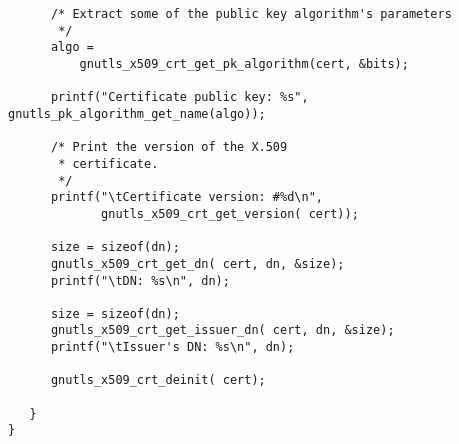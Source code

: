 \begin{verbatim}
      /* Extract some of the public key algorithm's parameters
       */
      algo =
          gnutls_x509_crt_get_pk_algorithm(cert, &bits);

      printf("Certificate public key: %s", gnutls_pk_algorithm_get_name(algo));

      /* Print the version of the X.509 
       * certificate.
       */
      printf("\tCertificate version: #%d\n",
             gnutls_x509_crt_get_version( cert));

      size = sizeof(dn);
      gnutls_x509_crt_get_dn( cert, dn, &size);
      printf("\tDN: %s\n", dn);

      size = sizeof(dn);
      gnutls_x509_crt_get_issuer_dn( cert, dn, &size);
      printf("\tIssuer's DN: %s\n", dn);

      gnutls_x509_crt_deinit( cert);

   }
}

\end{verbatim}
